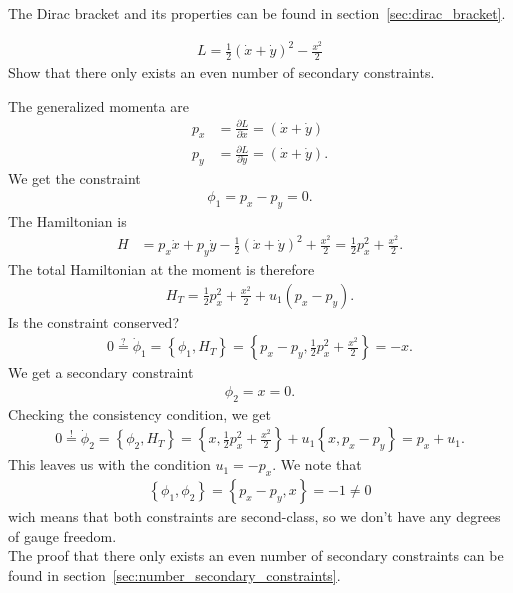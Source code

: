 \begin{solution}
The Dirac bracket and its properties can be found in section~\vref{sec:dirac_bracket}.
\end{solution}





\begin{exercise}
\begin{align*}
L = \frac{1}{2} (\dot{x} + \dot{y})^2 - \frac{x^2}{2}
\end{align*}
Show that there only exists an even number of secondary constraints.
\end{exercise}
\begin{solution}
The generalized momenta are
\begin{align*}
p_x &= \frac{\partial L}{\partial \dot{x}} = (\dot{x} + \dot{y}) \\
p_y &= \frac{\partial L}{\partial \dot{y}} = (\dot{x} + \dot{y}).
\end{align*}
We get the constraint 
\begin{align*}
\phi_1 = p_x - p_y = 0.
\end{align*}
The Hamiltonian is
\begin{align*}
H &= p_x \dot{x} + p_y \dot{y} - \frac{1}{2} (\dot{x} + \dot{y})^2 + \frac{x^2}{2} = \frac{1}{2} p_x^2 + \frac{x^2}{2}.
\end{align*}
The total Hamiltonian at the moment is therefore
\begin{align*}
H_T = \frac{1}{2} p_x^2 + \frac{x^2}{2} + u_1 (p_x - p_y).
\end{align*}
Is the constraint conserved?
\begin{align*}
0 \overset{?}{=} \dot{\phi}_1 = \left \{ \phi_1,H_T \right \} = \left \{ p_x - p_y,\frac{1}{2} p_x^2 + \frac{x^2}{2} \right \} = - x.
\end{align*}
We get a secondary constraint 
\begin{align*}
\phi_2 = x = 0.
\end{align*}
Checking the consistency condition, we get
\begin{align*}
0 \overset{!}{=} \dot{\phi}_2 = \left \{ \phi_2,H_T \right \} = \left \{ x,\frac{1}{2} p_x^2 + \frac{x^2}{2} \right \} + u_1 \left \{ x,p_x - p_y \right \} = p_x + u_1.
\end{align*}
This leaves us with the condition $u_1 = - p_x$. We note that 
\begin{align*}
\left \{ \phi_1,\phi_2 \right \} = \left \{ p_x - p_y,x \right \} = - 1 \neq 0
\end{align*}
wich means that both constraints are second-class, so we don't have any degrees of gauge freedom. \\

The proof that there only exists an even number of secondary constraints can be found in section~\vref{sec:number_secondary_constraints}.
\end{solution}





